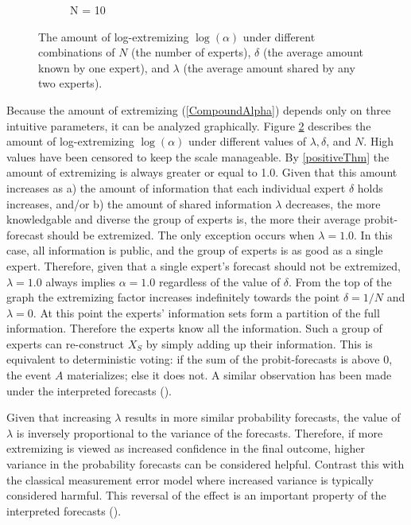 \documentclass[11pt]{article}
\theoremstyle{definition}
\theoremstyle{definition}
\begin{document}
\begin{figure}[t]
\begin{subfigure}[b]{0.499\textwidth}
\caption{N = 10}
\label{ExtremeN10}
        \end{subfigure}
        \caption{ The amount of log-extremizing $\log(\alpha)$ under different combinations of $N$ (the number of experts), $\delta$ (the average amount known by one expert), and $\lambda$ (the average amount shared by any two experts).}
        \label{Levelplots}
\end{figure}
 

Because the amount of extremizing (\ref{CompoundAlpha}) depends only on three intuitive parameters, it can be analyzed graphically. Figure \ref{Levelplots} describes the amount of log-extremizing $\log(\alpha)$ under different values of $\lambda, \delta$, and $N$. High values have been censored to keep the scale manageable. By  \ref{positiveThm} the amount of extremizing is always greater or equal to 1.0. Given that this amount increases as a) the amount of information that each individual expert $\delta$ holds increases, and/or b) the amount of shared information $\lambda$ decreases, the more knowledgable and diverse the group of experts is, the more their average probit-forecast should be extremized. The only exception occurs when $\lambda = 1.0$. In this case, all information is public, and the group of experts is as good as a single expert. Therefore, given that a single expert's forecast should not be extremized, $\lambda = 1.0$ always implies $\alpha = 1.0$ regardless of the value of $\delta$. From the top of the graph the extremizing factor increases indefinitely towards the point $\delta = 1/N$ and $\lambda = 0$. At this point the experts' information sets form a partition of the full information. Therefore the experts know all the information. Such a group of experts can re-construct $X_S$ by simply adding up their  information. This is equivalent to deterministic voting: if the sum of the probit-forecasts is above 0, the event $A$ materializes; else it does not. A similar observation has been made under the interpreted forecasts (\cite{hong2009interpreted}). 

Given that increasing $\lambda$ results in more similar probability forecasts, the value of $\lambda$ is inversely proportional to the variance of the forecasts. Therefore, if more extremizing is viewed as increased confidence in the final outcome, higher variance in the probability forecasts can be considered helpful. Contrast this with the classical measurement error model where increased variance is typically considered harmful. This reversal of the effect is an important property of the interpreted forecasts (\cite{hong2009interpreted}). 
\end{document}
